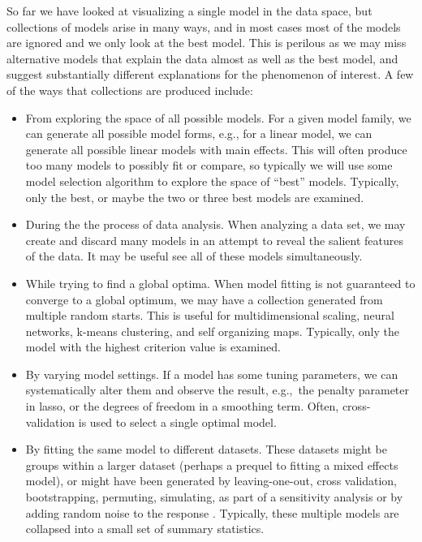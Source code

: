 \documentclass[preprint]{imsart}
\begin{document}
So far we have looked at visualizing a single model in the data space, but collections of models arise in many ways, and in most cases most of the models are ignored and we only look at the best model. This is perilous as we may miss alternative models that explain the data almost as well as the best model, and suggest substantially different explanations for the phenomenon of interest. A few of the ways that collections are produced include:

\begin{itemize} \itemsep 0in
  \item From exploring the space of all possible models.  For a given model family, we can generate all possible model forms, e.g., for a linear model, we can generate all possible linear models with main effects.  This will often produce too many models to possibly fit or compare, so typically we will use some model selection algorithm to explore the space of ``best'' models.  Typically, only the best, or maybe the two or three best models are examined.

  \item During the the process of data analysis.  When analyzing a data set, we may create and discard many models in an attempt to reveal the salient features of the data.  It may be useful see all of these models simultaneously.

  \item While trying to find a global optima. When model fitting is not guaranteed to converge to a global optimum, we may have a collection generated from multiple random starts.  This is useful for multidimensional scaling, neural networks, k-means clustering, and self organizing maps.  Typically, only the model with the highest criterion value is examined.


  \item By varying model settings.  If a model has some tuning parameters, we can systematically alter them and observe the result, e.g.,\ the penalty parameter in lasso, or the degrees of freedom in a smoothing term.  Often, cross-validation is used to select a single optimal model.

  \item By fitting the same model to different datasets.  These datasets might be groups within a larger dataset (perhaps a prequel to fitting a mixed effects model), or might have been generated by leaving-one-out, cross validation, bootstrapping, permuting, simulating, as part of a sensitivity analysis or by adding random noise to the response \citep{luo:2006}.  Typically, these multiple models are collapsed into a small set of summary statistics.


\end{itemize}
\end{document}
